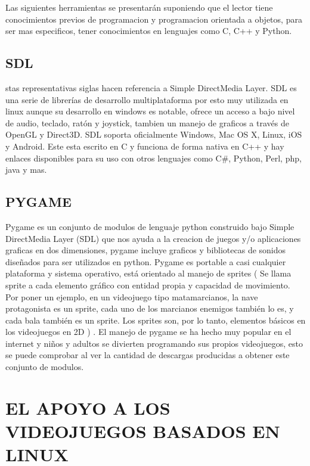 Las siguientes herramientas se presentarán suponiendo que el
lector tiene conocimientos previos de programacion y
programacion orientada a objetos, para ser mas especificos,
tener conocimientos en lenguajes como C, C++ y Python.

\subsection*{SDL}

stas representativas siglas hacen referencia a Simple
DirectMedia Layer. SDL es una serie de librerías de desarrollo
multiplataforma por esto muy utilizada en linux aunque su
desarrollo en windows es notable, ofrece un acceso a bajo nivel
de audio, teclado, ratón y joystick, tambien un manejo de
graficos a través de OpenGL y Direct3D. SDL soporta
oficialmente Windows, Mac OS X, Linux, iOS y Android. Este
esta escrito en C y funciona de forma nativa en C++ y hay
enlaces disponibles para su uso con otros lenguajes como C\#,
Python, Perl, php, java y mas.

\subsection*{PYGAME}

Pygame es un conjunto de modulos de lenguaje python
construido bajo Simple DirectMedia Layer (SDL) que nos ayuda
a la creacion de juegos y/o aplicaciones graficas en dos
dimensiones, pygame incluye graficos y bibliotecas de sonidos
diseñados para ser utilizados en python. Pygame es portable a
casi cualquier plataforma y sistema operativo, está orientado al
manejo de sprites ( Se llama sprite a cada elemento gráfico con
entidad propia y capacidad de movimiento. Por poner un
ejemplo, en un videojuego tipo matamarcianos, la nave
protagonista es un sprite, cada uno de los marcianos enemigos
también lo es, y cada bala también es un sprite. Los sprites son,
por lo tanto, elementos básicos en los videojuegos en 2D ) . El
manejo de pygame se ha hecho muy popular en el internet y
niños y adultos se divierten programando sus propios
videojuegos, esto se puede comprobar al ver la cantidad de
descargas producidas a obtener este conjunto de modulos.

\section*{EL APOYO A LOS VIDEOJUEGOS BASADOS EN LINUX}

